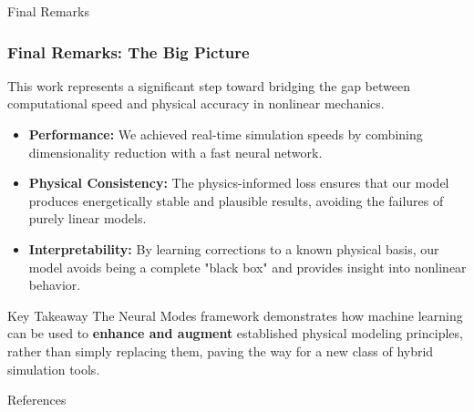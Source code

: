 \documentclass{beamer}
\begin{document}
\begin{frame}{Final Remarks}
    \frametitle{Final Remarks: The Big Picture}
    
    This work represents a significant step toward bridging the gap between computational speed and physical accuracy in nonlinear mechanics.
    
    \begin{itemize}
        \item \textbf{Performance:} We achieved real-time simulation speeds by combining dimensionality reduction with a fast neural network.
        \vspace{1em}
        
        \item \textbf{Physical Consistency:} The physics-informed loss ensures that our model produces energetically stable and plausible results, avoiding the failures of purely linear models.
        \vspace{1em}
        
        \item \textbf{Interpretability:} By learning corrections to a known physical basis, our model avoids being a complete "black box" and provides insight into nonlinear behavior.
    \end{itemize}
    
    \begin{alertblock}{Key Takeaway}
        The Neural Modes framework demonstrates how machine learning can be used to \textbf{enhance and augment} established physical modeling principles, rather than simply replacing them, paving the way for a new class of hybrid simulation tools.
    \end{alertblock}
\end{frame}

\begin{frame}{References}
    \printbibliography[heading=none]
\end{frame}
\end{document}
